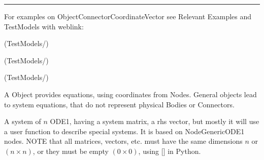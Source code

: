     \finishTable
\vspace{6pt}\par\noindent\rule{\textwidth}{0.4pt}
%
\noindent For examples on ObjectConnectorCoordinateVector see Relevant Examples and TestModels with weblink:
\bi
\item {} (TestModels/)
\item {} (TestModels/)
\item {} (TestModels/)

\ei

%

\newpage
A Object provides equations, using coordinates from Nodes. General objects lead to system equations, that do not represent physical Bodies or Connectors.


\label{sec:item:ObjectGenericODE1}
A system of $n$ \acf{ODE1}, having a system matrix, a rhs vector, but mostly it will use a user function to describe special  systems. It is based on NodeGenericODE1 nodes. NOTE that all matrices, vectors, etc. must have the same dimensions $n$ or $(n \times n)$, or they must be empty $(0 \times 0)$, using [] in Python.
\vspace{12pt}\\

